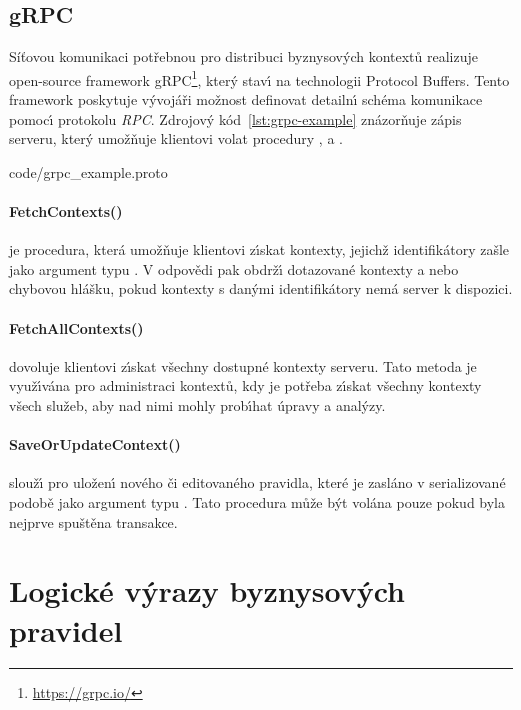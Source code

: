 \subsection{gRPC}

Síťovou komunikaci potřebnou pro distribuci byznysových kontextů realizuje
open-source framework gRPC\footnote{\url{https://grpc.io/}}, kter\'y stav\'{\i}
na technologii Protocol Buffers. Tento framework poskytuje v\'yvojáři
možnost definovat detailn\'{\i} schéma komunikace pomoc\'{\i} protokolu \textit{\gls{RPC}}.
Zdrojov\'y kód~\ref{lst:grpc-example} znázorňuje zápis serveru,
kter\'y umožňuje klientovi volat procedury ,
 a .


{code/grpc_example.proto}

\paragraph{FetchContexts()} je procedura, která umožňuje klientovi
z\'{\i}skat kontexty, jejichž identifikátory zašle jako argument
typu .
V odpovědi pak obdrž\'{\i} dotazované kontexty a nebo chybovou hlášku,
pokud kontexty s dan\'ymi identifikátory nemá server k dispozici.

\paragraph{FetchAllContexts()} dovoluje klientovi z\'{\i}skat všechny
dostupné kontexty serveru. Tato metoda je využ\'{\i}vána pro administraci
kontextů, kdy je potřeba z\'{\i}skat všechny kontexty všech služeb, aby
nad nimi mohly prob\'{\i}hat úpravy a anal\'yzy.

\paragraph{SaveOrUpdateContext()} slouž\'{\i} pro uložen\'{\i} nového či
editovaného pravidla, které je zasláno v serializované podobě
jako argument typu .
Tato procedura může být volána pouze pokud byla nejprve spuštěna transakce.

\section{Logické výrazy byznysových pravidel}

